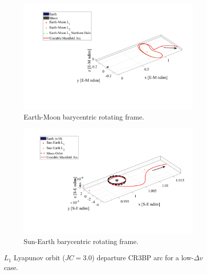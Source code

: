 \begin{figure}[!htb]
    \begin{subfigure}[h]{0.495\linewidth}
        \includegraphics[width=\textwidth]{figures/DirectMinDvEM.pdf}
        \caption{Earth-Moon barycentric rotating frame.}
    \end{subfigure}
    \hfill
    \begin{subfigure}[h]{0.495\linewidth}
        \includegraphics[width=\textwidth]{figures/DirectMinDvSE.pdf}
        \caption{Sun-Earth barycentric rotating frame.}
    \end{subfigure}
    \caption{$L_{1}$ Lyapunov orbit ($JC=3.0$) departure CR3BP arc for a low-$\Delta v$ case.}
    \label{fig:directMinDvE}
\end{figure}

